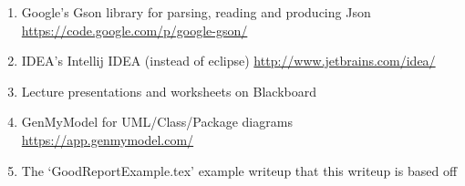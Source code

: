 \documentclass[a4paper, 11pt]{article}
\begin{document}
\begin{enumerate}
\item Google's Gson library for parsing, reading and producing Json \url{https://code.google.com/p/google-gson/}
\item IDEA's Intellij IDEA (instead of eclipse) \url{http://www.jetbrains.com/idea/} 
\item Lecture presentations and worksheets on Blackboard
\item GenMyModel for UML/Class/Package diagrams \url{https://app.genmymodel.com/}
\item The `GoodReportExample.tex' example writeup that this writeup is based off
\end{enumerate}
\end{document}
